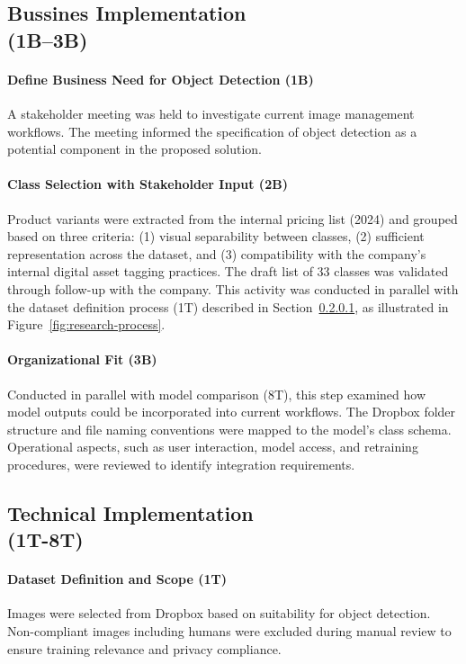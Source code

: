 \documentclass[a4paper,10pt,twocolumn]{article}
\numberwithin{figure}{section}
\numberwithin{table}{section}
\begin{document}
\subsection{Bussines Implementation\\(1B–3B)}

\paragraph{Define Business Need for Object Detection (1B)}
A stakeholder meeting was held to investigate current image 
management workflows. The meeting informed the specification 
of object detection as a potential component in the 
proposed solution.

\paragraph{Class Selection with Stakeholder Input (2B)}
Product variants were extracted from the internal pricing list (2024) and grouped based on three criteria: (1) visual separability between classes, (2) sufficient representation across the dataset, and (3) compatibility with the company’s internal digital asset tagging
practices. The draft list of 33 classes was validated through follow-up with the company. 
This activity was conducted in parallel with the dataset definition process (1T) described in Section~\ref{sec:dataset-scope}, as illustrated in Figure~\ref{fig:research-process}.

\paragraph{Organizational Fit (3B)}
Conducted in parallel with 
model comparison (8T), this step examined how model 
outputs could be incorporated into current workflows. 
The Dropbox folder structure and file naming 
conventions were mapped to the model’s class 
schema. Operational aspects, 
such as user interaction, model access, and 
retraining procedures, were reviewed to 
identify integration requirements.


\subsection{Technical Implementation\\(1T-8T)}
\paragraph{Dataset Definition and Scope (1T)} \label{sec:dataset-scope}
Images were selected from Dropbox based on 
suitability for object detection. Non-compliant images including humans were excluded 
during manual review to ensure training relevance and privacy compliance.
\end{document}
